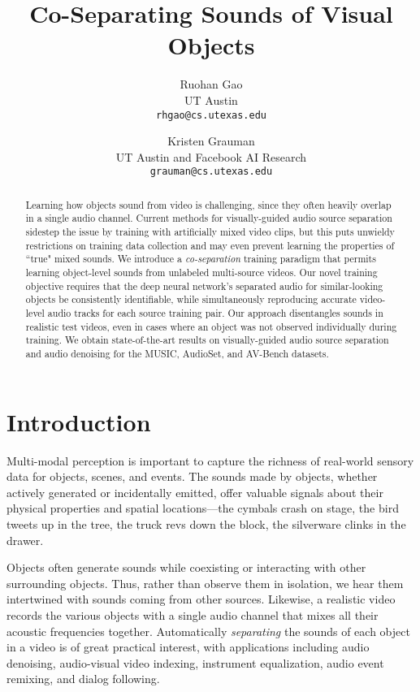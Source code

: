 \documentclass[10pt,twocolumn,letterpaper]{article}
\begin{document}
\title{Co-Separating Sounds of Visual Objects}
\author{Ruohan Gao\\
UT Austin\\
{\tt\small rhgao@cs.utexas.edu}
\and
Kristen Grauman\\
UT Austin and Facebook AI Research\\
{\tt\small grauman@cs.utexas.edu}}

\maketitle




\begin{abstract} 
Learning how objects sound from video is challenging, since they often heavily overlap in a single audio channel. Current methods for visually-guided audio source separation sidestep the issue by training with artificially mixed video clips, but this puts unwieldy restrictions on training data collection and may even prevent learning the properties of ``true" mixed sounds. We introduce a \emph{co-separation} training paradigm that permits learning object-level sounds from unlabeled multi-source videos. Our novel training objective requires that the deep neural network's separated audio for similar-looking objects be consistently identifiable, while simultaneously reproducing accurate video-level audio tracks for each source training pair. Our approach disentangles sounds in realistic test videos, even in cases where an object was not observed individually during training. We obtain state-of-the-art results on visually-guided audio source separation and audio denoising for the MUSIC, AudioSet, and AV-Bench datasets. 


\end{abstract}
 \section{Introduction}
\label{sec:intro}

Multi-modal perception is important to capture the richness of real-world sensory data for objects, scenes, and events. The sounds made by objects, whether actively generated or incidentally emitted, offer valuable signals about their physical properties and spatial locations---the cymbals crash on stage, the bird tweets up in the tree, the truck revs down the block, the silverware clinks in the drawer.

Objects often generate sounds while coexisting or interacting with other surrounding objects. Thus, rather than observe them in isolation, we hear them intertwined with sounds coming from other sources. Likewise, a realistic video records the various objects with a single audio channel that mixes all their acoustic frequencies together. Automatically \emph{separating} the sounds of each object in a video is of great practical interest, with applications including audio denoising, audio-visual video indexing, instrument equalization, audio event remixing, and dialog following.
\end{document}

